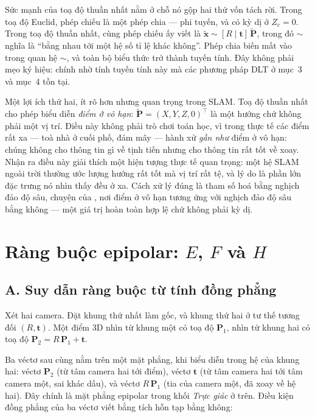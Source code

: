 \documentclass[../../vslam.tex]{subfiles}
\begin{document}
Sức mạnh của toạ độ thuần nhất nằm ở chỗ nó gộp hai thứ vốn tách rời. Trong toạ độ Euclid, phép chiếu là một phép chia --- phi tuyến, và có kỳ dị ở \(Z_c = 0\). Trong toạ độ thuần nhất, cùng phép chiếu ấy viết là \(\tilde{\mathbf{x}} \sim [R \mid \mathbf{t}]\, \tilde{\mathbf{P}}\), trong đó \(\sim\) nghĩa là ``bằng nhau tới một hệ số tỉ lệ khác không''. Phép chia biến mất vào trong quan hệ \(\sim\), và toàn bộ biểu thức trở thành tuyến tính. Đây không phải mẹo ký hiệu: chính nhờ tính tuyến tính này mà các phương pháp DLT ở mục~3 và mục~4 tồn tại.

Một lợi ích thứ hai, ít rõ hơn nhưng quan trọng trong SLAM. Toạ độ thuần nhất cho phép biểu diễn \emph{điểm ở vô hạn}: \(\tilde{\mathbf{P}} = (X,Y,Z,0)^{\top}\) là một hướng chứ không phải một vị trí. Điều này không phải trò chơi toán học, vì trong thực tế các điểm rất xa --- toà nhà ở cuối phố, đám mây --- hành xử \emph{gần như} điểm ở vô hạn: chúng không cho thông tin gì về tịnh tiến nhưng cho thông tin rất tốt về xoay. Nhận ra điều này giải thích một hiện tượng thực tế quan trọng: một hệ SLAM ngoài trời thường ước lượng hướng rất tốt mà vị trí rất tệ, và lý do là phần lớn đặc trưng nó nhìn thấy đều ở xa. Cách xử lý đúng là tham số hoá bằng nghịch đảo độ sâu, chuyện của , nơi điểm ở vô hạn tương ứng với nghịch đảo độ sâu bằng không --- một giá trị hoàn toàn hợp lệ chứ không phải kỳ dị.

\section{Ràng buộc epipolar: \(E\), \(F\) và \(H\)}

\subsection{A. Suy dẫn ràng buộc từ tính đồng phẳng}

Xét hai camera. Đặt khung thứ nhất làm gốc, và khung thứ hai ở tư thế tương đối \((R, \mathbf{t})\). Một điểm \(3\)D nhìn từ khung một có toạ độ \(\mathbf{P}_1\), nhìn từ khung hai có toạ độ \(\mathbf{P}_2 = R\,\mathbf{P}_1 + \mathbf{t}\).

Ba véctơ sau cùng nằm trên một mặt phẳng, khi biểu diễn trong hệ của khung hai: véctơ \(\mathbf{P}_2\) (từ tâm camera hai tới điểm), véctơ \(\mathbf{t}\) (từ tâm camera hai tới tâm camera một, sai khác dấu), và véctơ \(R\,\mathbf{P}_1\) (tia của camera một, đã xoay về hệ hai). Đây chính là mặt phẳng epipolar trong khối \emph{Trực giác} ở trên. Điều kiện đồng phẳng của ba véctơ viết bằng tích hỗn tạp bằng không:
\end{document}
